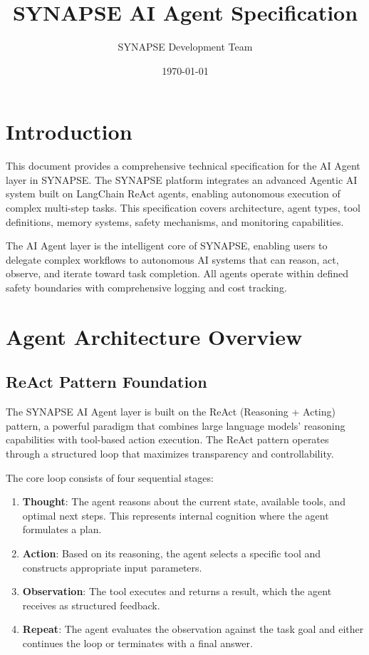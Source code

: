 \documentclass{report}
\title{SYNAPSE AI Agent Specification}
\author{SYNAPSE Development Team}
\date{\today}
\begin{document}
\maketitle

\tableofcontents

\chapter{Introduction}

This document provides a comprehensive technical specification for the AI Agent layer in SYNAPSE. The SYNAPSE platform integrates an advanced Agentic AI system built on LangChain ReAct agents, enabling autonomous execution of complex multi-step tasks. This specification covers architecture, agent types, tool definitions, memory systems, safety mechanisms, and monitoring capabilities.

The AI Agent layer is the intelligent core of SYNAPSE, enabling users to delegate complex workflows to autonomous AI systems that can reason, act, observe, and iterate toward task completion. All agents operate within defined safety boundaries with comprehensive logging and cost tracking.

\chapter{Agent Architecture Overview}

\section{ReAct Pattern Foundation}

The SYNAPSE AI Agent layer is built on the ReAct (Reasoning + Acting) pattern, a powerful paradigm that combines large language models' reasoning capabilities with tool-based action execution. The ReAct pattern operates through a structured loop that maximizes transparency and controllability.

The core loop consists of four sequential stages:

\begin{enumerate}
    \item \textbf{Thought}: The agent reasons about the current state, available tools, and optimal next steps. This represents internal cognition where the agent formulates a plan.
    \item \textbf{Action}: Based on its reasoning, the agent selects a specific tool and constructs appropriate input parameters.
    \item \textbf{Observation}: The tool executes and returns a result, which the agent receives as structured feedback.
    \item \textbf{Repeat}: The agent evaluates the observation against the task goal and either continues the loop or terminates with a final answer.
\end{enumerate}
\end{document}
